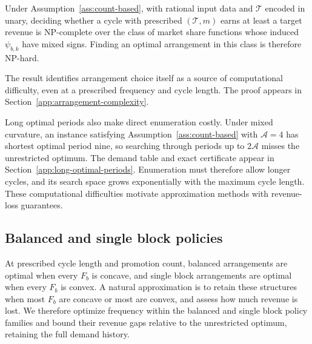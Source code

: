 \begin{proposition}
\label{prop:arrangement-np-complete}
Under Assumption~\ref{ass:count-based}, with rational input data and \(\mathcal T\) encoded in unary, deciding whether a cycle with prescribed \((\mathcal T,m)\) earns at least a target revenue is NP-complete over the class of market share functions whose induced \(\psi_{b,k}\) have mixed signs. Finding an optimal arrangement in this class is therefore NP-hard.
\end{proposition}

\begingroup\color{black}
The result identifies arrangement choice itself as a source of computational difficulty, even at a prescribed frequency and cycle length. The proof appears in Section~\ref{app:arrangement-complexity}.
\par\endgroup

\begingroup\color{black}
Long optimal periods also make direct enumeration costly. Under mixed curvature, an instance satisfying Assumption~\ref{ass:count-based} with \(\mathcal A=4\) has shortest optimal period nine, so searching through periods up to \(2\mathcal A\) misses the unrestricted optimum. The demand table and exact certificate appear in Section~\ref{app:long-optimal-periods}. Enumeration must therefore allow longer cycles, and its search space grows exponentially with the maximum cycle length. These computational difficulties motivate approximation methods with revenue-loss guarantees.
\par\endgroup
\par\endgroup

\begingroup\color{black}
\subsection{Balanced and single block policies}
\label{sec:simple-policy-guarantees}

\begingroup\color{black}
At prescribed cycle length and promotion count, balanced arrangements are optimal when every \(F_b\) is concave, and single block arrangements are optimal when every \(F_b\) is convex. A natural approximation is to retain these structures when most \(F_b\) are concave or most are convex, and assess how much revenue is lost. We therefore optimize frequency within the balanced and single block policy families and bound their revenue gaps relative to the unrestricted optimum, retaining the full demand history.
\par\endgroup

